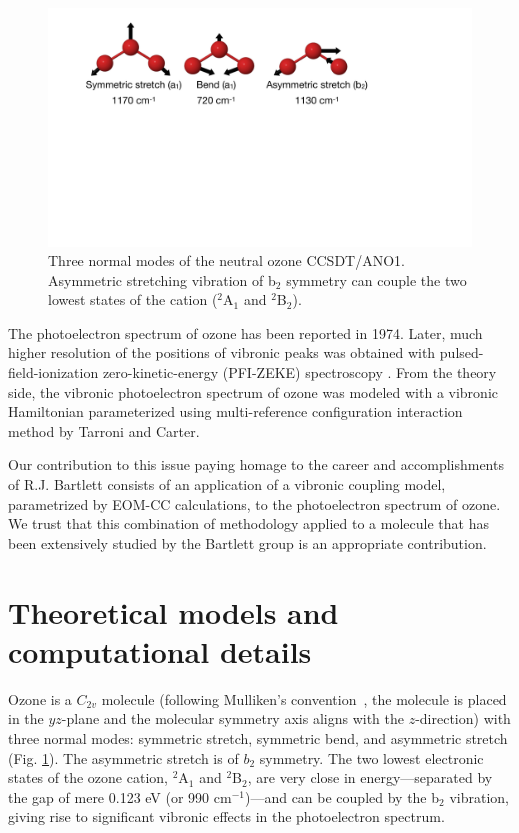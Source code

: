 \documentclass[12pt,prb,aps]{revtex4}
\begin{document}
\begin{figure}[h!]
\includegraphics[width = 8 cm]{./figures/vibrations.pdf}
\caption{Three normal modes of the neutral ozone CCSDT/ANO1. Asymmetric stretching vibration of b$_2$ symmetry can couple the two lowest states of the cation ($^2$A$_1$ and $^2$B$_2$). 
\label{fig:vib}}
\end{figure}

The photoelectron spectrum of ozone has been reported\cite{dyke:O3:74} in 1974. Later,  much higher resolution of the positions of vibronic peaks was obtained with 
pulsed-field-ionization zero-kinetic-energy (PFI-ZEKE) spectroscopy \cite{Willitsch:O3ZEKE:2005}. From the theory side, the vibronic photoelectron spectrum of ozone was modeled with a vibronic Hamiltonian parameterized using multi-reference configuration interaction method
by Tarroni and Carter\cite{Willitsch:O3ZEKE:2005}.

Our contribution to this issue paying homage to the career and accomplishments
of R.J. Bartlett consists of an application of a vibronic coupling model,
parametrized by EOM-CC calculations, to the photoelectron spectrum of ozone.
We trust that this combination of methodology applied to a molecule that has
been extensively studied by the Bartlett group is an appropriate contribution.



\section{Theoretical models and computational details}

Ozone is a $C_{2v}$ molecule (following Mulliken's
convention~\cite{Mulliken:55:symnot}, the molecule is placed in the $yz$-plane
and the molecular symmetry axis aligns with the $z$-direction) with three
normal modes: symmetric stretch, symmetric bend, and asymmetric stretch (Fig. \ref{fig:vib}).  
The asymmetric stretch is of $b_2$ symmetry. The two lowest electronic states of
the ozone cation, $^2$A$_1$ and $^2$B$_2$, are very close in energy---separated by the gap 
of mere 0.123 eV (or 990 cm$^{-1}$)---and can be coupled by the b$_2$ vibration, giving rise
to significant vibronic effects in the photoelectron spectrum.  
\end{document}
